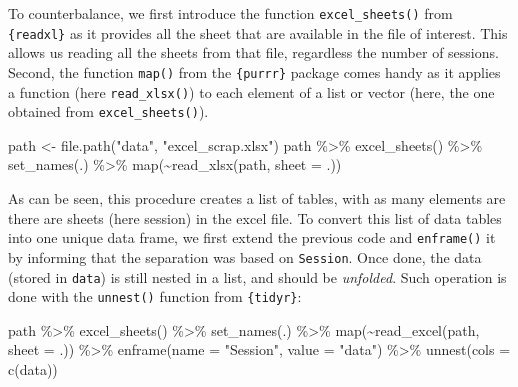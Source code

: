 \documentclass[
]{book}
\newenvironment{Shaded}{\begin{snugshade}}{\end{snugshade}}
\newcommand{\AttributeTok}[1]{\textcolor[rgb]{0.77,0.63,0.00}{#1}}
\newcommand{\FunctionTok}[1]{\textcolor[rgb]{0.00,0.00,0.00}{#1}}
\newcommand{\NormalTok}[1]{#1}
\newcommand{\OtherTok}[1]{\textcolor[rgb]{0.56,0.35,0.01}{#1}}
\newcommand{\SpecialCharTok}[1]{\textcolor[rgb]{0.00,0.00,0.00}{#1}}
\newcommand{\StringTok}[1]{\textcolor[rgb]{0.31,0.60,0.02}{#1}}
\begin{document}
To counterbalance, we first introduce the function \texttt{excel\_sheets()} from \texttt{\{readxl\}} as it provides all the sheet that are available in the file of interest. This allows us reading all the sheets from that file, regardless the number of sessions. Second, the function \texttt{map()} from the \texttt{\{purrr\}} package comes handy as it applies a function (here \texttt{read\_xlsx()}) to each element of a list or vector (here, the one obtained from \texttt{excel\_sheets()}).

\begin{Shaded}
\begin{Highlighting}[]
\NormalTok{path }\OtherTok{\textless{}{-}} \FunctionTok{file.path}\NormalTok{(}\StringTok{"data"}\NormalTok{, }\StringTok{"excel\_scrap.xlsx"}\NormalTok{) }
\NormalTok{path }\SpecialCharTok{\%\textgreater{}\%} 
  \FunctionTok{excel\_sheets}\NormalTok{() }\SpecialCharTok{\%\textgreater{}\%} 
  \FunctionTok{set\_names}\NormalTok{(.) }\SpecialCharTok{\%\textgreater{}\%} 
  \FunctionTok{map}\NormalTok{(}\SpecialCharTok{\textasciitilde{}}\FunctionTok{read\_xlsx}\NormalTok{(path, }\AttributeTok{sheet =}\NormalTok{ .))}
\end{Highlighting}
\end{Shaded}

As can be seen, this procedure creates a list of tables, with as many elements are there are sheets (here session) in the excel file. To convert this list of data tables into one unique data frame, we first extend the previous code and \texttt{enframe()} it by informing that the separation was based on \texttt{Session}. Once done, the data (stored in \texttt{data}) is still nested in a list, and should be \emph{unfolded}. Such operation is done with the \texttt{unnest()} function from \texttt{\{tidyr\}}:

\begin{Shaded}
\begin{Highlighting}[]
\NormalTok{path }\SpecialCharTok{\%\textgreater{}\%} 
  \FunctionTok{excel\_sheets}\NormalTok{() }\SpecialCharTok{\%\textgreater{}\%} 
  \FunctionTok{set\_names}\NormalTok{(.) }\SpecialCharTok{\%\textgreater{}\%} 
  \FunctionTok{map}\NormalTok{(}\SpecialCharTok{\textasciitilde{}}\FunctionTok{read\_excel}\NormalTok{(path, }\AttributeTok{sheet =}\NormalTok{ .)) }\SpecialCharTok{\%\textgreater{}\%} 
  \FunctionTok{enframe}\NormalTok{(}\AttributeTok{name =} \StringTok{"Session"}\NormalTok{, }\AttributeTok{value =} \StringTok{"data"}\NormalTok{) }\SpecialCharTok{\%\textgreater{}\%} 
  \FunctionTok{unnest}\NormalTok{(}\AttributeTok{cols =} \FunctionTok{c}\NormalTok{(data))}
\end{Highlighting}
\end{Shaded}
\end{document}
